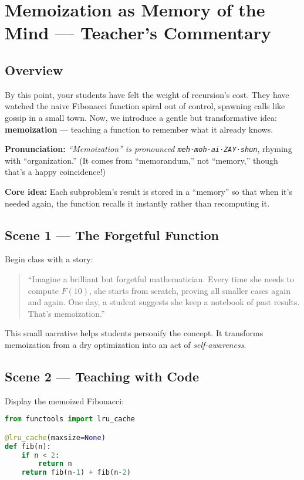 \chapter{Memoization as Memory of the Mind --- Teacher’s Commentary}
\label{ch:memoization-mind-solution}

\section*{Overview}
By this point, your students have felt the weight of recursion’s cost. They have watched the naive Fibonacci function spiral out of control, spawning calls like gossip in a small town.  
Now, we introduce a gentle but transformative idea: \textbf{memoization} — teaching a function to remember what it already knows.

\bigskip
\noindent
\textbf{Pronunciation:} \emph{“Memoization” is pronounced \texttt{meh·moh·ai·ZAY·shun}}, rhyming with “organization.”  
(It comes from “memorandum,” not “memory,” though that’s a happy coincidence!)

\bigskip
\noindent
\textbf{Core idea:} Each subproblem’s result is stored in a “memory” so that when it’s needed again, the function recalls it instantly rather than recomputing it.

\section*{Scene 1 --- The Forgetful Function}
Begin class with a story:  
\begin{quote}
“Imagine a brilliant but forgetful mathematician.  
Every time she needs to compute $F(10)$, she starts from scratch, proving all smaller cases again and again.  
One day, a student suggests she keep a notebook of past results.  
That’s memoization.”  
\end{quote}

This small narrative helps students personify the concept.  
It transforms memoization from a dry optimization into an act of \emph{self-awareness}.

\section*{Scene 2 --- Teaching with Code}
Display the memoized Fibonacci:

\begin{lstlisting}[language=Python,caption={Memoized Fibonacci in Python},label={lst:memo-fib}]
from functools import lru_cache

@lru_cache(maxsize=None)
def fib(n):
    if n < 2:
        return n
    return fib(n-1) + fib(n-2)
\end{lstlisting}

